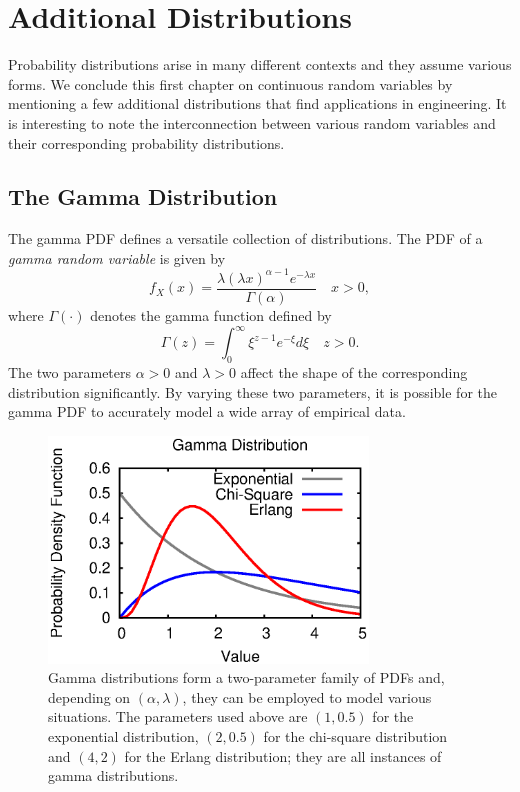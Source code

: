 \section{Additional Distributions}

Probability distributions arise in many different contexts and they assume various forms.
We conclude this first chapter on continuous random variables by mentioning a few additional distributions that find applications in engineering.
It is interesting to note the interconnection between various random variables and their corresponding probability distributions.


\subsection{The Gamma Distribution}

The gamma PDF defines a versatile collection of distributions.
The PDF of a \emph{gamma random variable} is given by 
\begin{equation*}
f_X (x) = \frac{\lambda (\lambda x)^{\alpha - 1} e^{-\lambda x}}{\Gamma (\alpha)} \quad  x > 0,
\end{equation*}
where $\Gamma(\cdot)$ denotes the gamma function defined by
\begin{equation*}
\Gamma (z) = \int_0^{\infty} \xi^{z-1} e^{-\xi} d\xi \quad z > 0 .
\end{equation*}
The two parameters $\alpha > 0$ and $\lambda > 0$ affect the shape of the corresponding distribution significantly.
By varying these two parameters, it is possible for the gamma PDF to accurately model a wide array of empirical data.

\begin{figure}[ht]
\begin{center}
\includegraphics[width=8.5cm]{Figures/8chapter/gamma_pdf}
\end{center}
\caption{Gamma distributions form a two-parameter family of PDFs and, depending on $(\alpha, \lambda)$, they can be employed to model various situations.
The parameters used above are $(1, 0.5)$ for the exponential distribution, $(2, 0.5)$ for the chi-square distribution and $(4, 2)$ for the Erlang distribution;
they are all instances of gamma distributions.}
\label{figure:GammaDistribution}
\end{figure}

